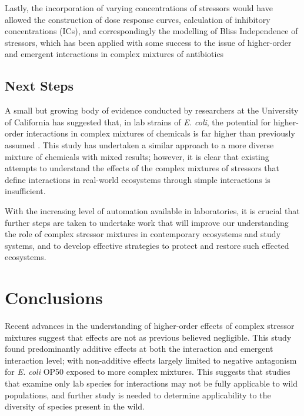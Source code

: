 \documentclass[final,1p,times]{elsarticle}
\begin{document}
Lastly, the incorporation of varying concentrations of stressors would have allowed the construction of dose response curves, calculation of inhibitory concentrations (ICs), and correspondingly the modelling of Bliss Independence \cite{Bliss1939} of stressors, which has been applied with some success to the issue of higher-order and emergent interactions in complex mixtures of antibiotics \cite{Beppler2016UncoveringStressors,Tekin2017PrevalenceInteractions} 
\subsection{Next Steps}
\label{S:4:4}

A small but growing body of evidence conducted by researchers at the University of California has suggested that, in lab strains of \textit{E. coli}, the potential for higher-order interactions in complex mixtures of chemicals is far higher than previously assumed \cite{Beppler2016UncoveringStressors,Tekin2016,Tekin2017PrevalenceInteractions}.  This study has undertaken a similar approach to a more diverse mixture of chemicals with mixed results; however, it is clear that existing attempts to understand the effects of the complex mixtures of stressors that define interactions in real-world ecosystems through simple interactions is insufficient.

With the increasing level of automation available in laboratories, it is crucial that further steps are taken to undertake work that will improve our understanding the role of complex stressor mixtures in contemporary ecosystems and study systems, and to develop effective strategies to protect and restore such effected ecosystems.

\section{Conclusions}
\label{S:5}

Recent advances in the understanding of higher-order effects of complex stressor mixtures suggest that effects are not as previous believed negligible. This study found predominantly additive effects at both the interaction and emergent interaction level; with non-additive effects largely limited to negative antagonism for \textit{E. coli} OP50 exposed to more complex mixtures. This suggests that studies that examine only lab species for interactions may not be fully applicable to wild populations, and further study is needed to determine applicability to the diversity of species present in the wild.
\end{document}

